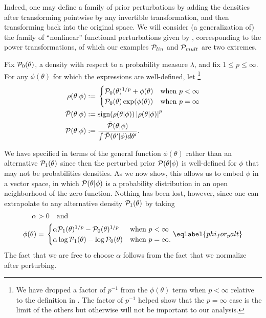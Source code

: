 Indeed, one may define a family of prior perturbations by adding the densities
after transforming pointwise by any invertible transformation, and then
transforming back into the original space.  We will consider (a generalization
of) the family of ``nonlinear'' functional perturbations given by
\citep{gustafson:1996:local}, corresponding to the power transformations, of
which our examples $\mathcal{P}_{lin}$ and $\mathcal{P}_{mult}$ are two extremes.

\begin{defn}
%
Fix $\mathcal{P}_{0}(\theta)$, a density with respect to a probability measure $\lambda$,
and fix $1 \le p \le \infty$.  For any $\phi(\theta)$ for which the expressions
are well-defined, let \footnote{We have dropped a factor of $p^{-1}$ from the
$\phi(\theta)$ term when $p < \infty$ relative to the definition in
\citep{gustafson:1996:local}.  The factor of $p^{-1}$ helped show that the
$p=\infty$ case is the limit of the others but otherwise will not be important
to our analysis.}
%
\begin{align*}
%
\rho(\theta \vert \phi) :={}& \begin{cases}
%
\pbase(\theta)^{1/p} + \phi(\theta)
    & \textrm{when }p < \infty \\
\pbase(\theta)\exp(\phi(\theta))
    & \textrm{when }p = \infty
%
\end{cases}\\
%
\tilde{\p}(\theta \vert \phi) :={}&
    \mathrm{sign}(\rho(\theta \vert \phi)) \abs{\rho(\theta \vert \phi)}^p\\
\p(\theta \vert \phi) :={}&
    \frac{\tilde{\p}(\theta \vert \phi)}
         {\int \tilde{\p}(\theta' \vert \phi) d\theta'}.
%
\end{align*}
%
\end{defn}
%

We have specified  in terms of the general function
$\phi(\theta)$ rather than an alternative $\mathcal{P}_{1}(\theta)$ since then the
perturbed prior $\mathcal{P}(\theta \vert \phi)$ is well-defined for $\phi$ that may not
be probabilities densities.  As we now show, this allows us to embed $\phi$ in a
vector space, in which $\mathcal{P}(\theta \vert \phi)$ is a probability distribution in
an open neighborhood of the zero function.  Nothing has been lost, however,
since one can extrapolate to any alternative density $\mathcal{P}_{1}(\theta)$ by taking
%
\begin{align}
%
\alpha  >{}& 0 \mathand \nonumber\\
\phi(\theta) ={}&
\begin{cases}
\alpha \palt(\theta)^{1/p} - \pbase(\theta)^{1/p}
    & \textrm{when }p < \infty \\
\alpha \log \palt(\theta) - \log \pbase(\theta)
    & \textrm{when }p = \infty.
\end{cases} \eqlabel{phi_for_palt}
%
\end{align}
%
The fact that we are free to choose $\alpha$ follows from the fact that we
normalize after perturbing.

